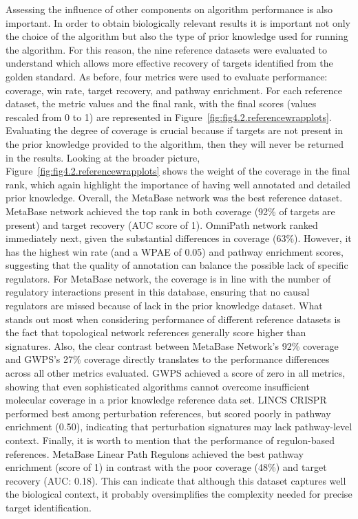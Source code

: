 Assessing the influence of other components on algorithm performance is also important. In order to obtain biologically relevant results it is important not only the choice of the algorithm but also the type of prior knowledge used for running the algorithm. For this reason, the nine reference datasets were evaluated to understand which allows more effective recovery of targets identified from the golden standard. As before, four metrics were used to evaluate performance: coverage, win rate, target recovery, and pathway enrichment. For each reference dataset, the metric values and the final rank, with the final scores (values rescaled from 0 to 1) are represented in Figure~\ref{fig:fig4.2.referencewrapplots}. Evaluating the degree of coverage is crucial because if targets are not present in the prior knowledge provided to the algorithm, then they will never be returned in the results. Looking at the broader picture, Figure~\ref{fig:fig4.2.referencewrapplots} shows the weight of the coverage in the final rank, which again highlight the importance of having well annotated and detailed prior knowledge. Overall, the MetaBase network was the best reference dataset. MetaBase network achieved the top rank in both coverage (92\% of targets are present) and target recovery (\gls{AUC} score of 1). OmniPath network ranked immediately next, given the substantial differences in coverage (63\%).  However, it has the highest win rate (and a \gls{WPAE} of 0.05) and pathway enrichment scores, suggesting that the quality of annotation can balance the possible lack of specific regulators. For MetaBase network, the coverage is in line with the number of regulatory interactions present in this database, ensuring that no causal regulators are missed because of lack in the prior knowledge dataset. What stands out most when considering performance of different reference datasets is the fact that topological network references generally score higher than signatures. Also, the clear contrast between MetaBase Network's 92\% coverage and \gls{GWPS}'s 27\% coverage directly translates to the performance differences across all other metrics evaluated. \gls{GWPS} achieved a score of zero in all metrics, showing that even sophisticated algorithms cannot overcome insufficient molecular coverage in a prior knowledge reference data set. \gls{LINCS} \gls{CRISPR} performed best among perturbation references, but scored poorly in pathway enrichment (0.50), indicating that perturbation signatures may lack pathway-level context. Finally, it is worth to mention that the performance of regulon-based references. MetaBase Linear Path Regulons achieved the best pathway enrichment (score of 1) in contrast with the poor coverage (48\%) and target recovery (\gls{AUC}: 0.18). This can indicate that although this dataset captures well the biological context, it probably oversimplifies the complexity needed for precise target identification.

